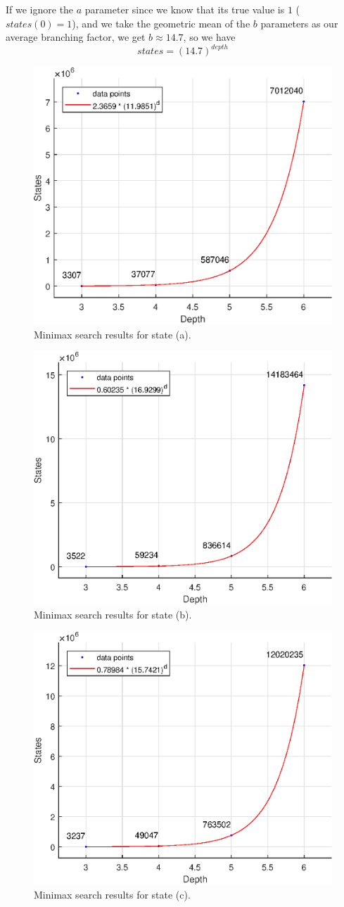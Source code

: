 \documentclass[journal,hidelinks]{IEEEtran}
\begin{document}
If we ignore the $a$ parameter since we know that its true value is $1$ ($states(0) = 1$), and we take the geometric mean of the $b$ parameters as our average branching factor, we get $b \approx 14.7$, so we have
\[
states = (14.7)^{depth}
\]

\begin{figure}[!htb]
  \centering
  \includegraphics[width=0.6\columnwidth]{state-1/minimax.eps}
  \caption{Minimax search results for state (a).}
  \label{fig:state-1-minimax}
\end{figure}

\begin{figure}[!htb]
  \centering
  \includegraphics[width=0.6\columnwidth]{state-2/minimax.eps}
  \caption{Minimax search results for state (b).}
  \label{fig:state-2-minimax}
\end{figure}

\begin{figure}[!htb]
  \centering
  \includegraphics[width=0.6\columnwidth]{state-3/minimax.eps}
  \caption{Minimax search results for state (c).}
  \label{fig:state-3-minimax}
\end{figure}
\end{document}
